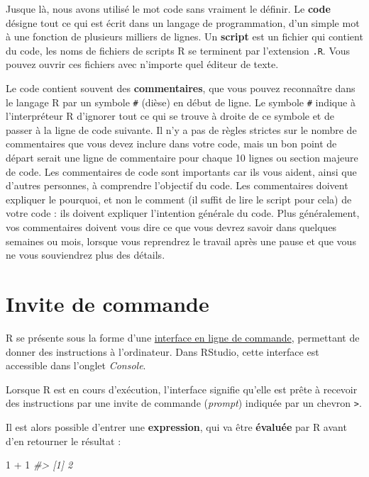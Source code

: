 \documentclass[
  french,
]{scrbook}
\newenvironment{Shaded}{\begin{snugshade}}{\end{snugshade}}
\newcommand{\CommentTok}[1]{\textcolor[rgb]{0.56,0.35,0.01}{\textit{#1}}}
\newcommand{\DecValTok}[1]{\textcolor[rgb]{0.00,0.00,0.81}{#1}}
\newcommand{\SpecialCharTok}[1]{\textcolor[rgb]{0.00,0.00,0.00}{#1}}
\begin{document}
Jusque là, nous avons utilisé le mot code sans vraiment le définir. Le \textbf{code} désigne tout ce qui est écrit dans un langage de programmation, d'un simple mot à une fonction de plusieurs milliers de lignes. Un \textbf{script} est un fichier qui contient du code, les noms de fichiers de scripts R se terminent par l'extension \texttt{.R}. Vous pouvez ouvrir ces fichiers avec n'importe quel éditeur de texte.

Le code contient souvent des \textbf{commentaires}, que vous pouvez reconnaître dans le langage R par un symbole \texttt{\#} (dièse) en début de ligne. Le symbole \texttt{\#} indique à l'interpréteur R d'ignorer tout ce qui se trouve à droite de ce symbole et de passer à la ligne de code suivante. Il n'y a pas de règles strictes sur le nombre de commentaires que vous devez inclure dans votre code, mais un bon point de départ serait une ligne de commentaire pour chaque 10 lignes ou section majeure de code. Les commentaires de code sont importants car ils vous aident, ainsi que d'autres personnes, à comprendre l'objectif du code. Les commentaires doivent expliquer le pourquoi, et non le comment (il suffit de lire le script pour cela) de votre code : ils doivent expliquer l'intention générale du code. Plus généralement, vos commentaires doivent vous dire ce que vous devrez savoir dans quelques semaines ou mois, lorsque vous reprendrez le travail après une pause et que vous ne vous souviendrez plus des détails.

\hypertarget{r-console}{%
\section{Invite de commande}\label{r-console}}

R se présente sous la forme d'une \href{https://fr.wikipedia.org/wiki/Interface_en_ligne_de_commande}{interface en ligne de commande}, permettant de donner des instructions à l'ordinateur. Dans RStudio, cette interface est accessible dans l'onglet \emph{Console}.

Lorsque R est en cours d'exécution, l'interface signifie qu'elle est prête à recevoir des instructions par une invite de commande (\emph{prompt}) indiquée par un chevron \texttt{\textgreater{}}.

Il est alors possible d'entrer une \textbf{expression}, qui va être \textbf{évaluée} par R avant d'en retourner le résultat :

\begin{Shaded}
\begin{Highlighting}[]
\DecValTok{1} \SpecialCharTok{+} \DecValTok{1}
\CommentTok{\#\textgreater{} [1] 2}
\end{Highlighting}
\end{Shaded}
\end{document}

